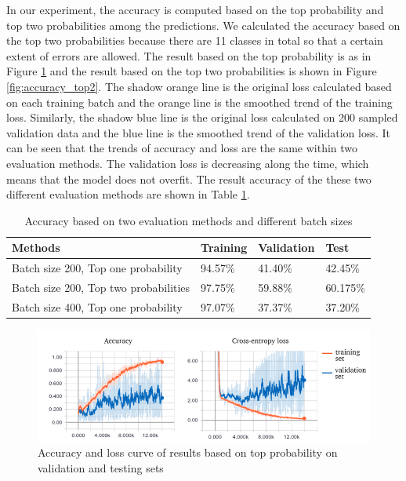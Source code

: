 \documentclass{article}
\begin{document}
\noindent In our experiment, the accuracy is computed based on the top probability and top two probabilities among the predictions. We calculated the accuracy based on the top two probabilities because there are 11 classes in total so that a certain extent of errors are allowed. The result based on the top probability is as in Figure \ref{fig:accuracy_top1} and the result based on the top two probabilities is shown in Figure \ref{fig:accuracy_top2}. The shadow orange line is the original loss calculated based on each training batch and the orange line is the smoothed trend of the training loss. Similarly, the shadow blue line is the original loss calculated on 200 sampled validation data and the blue line is the smoothed trend of the validation loss. It can be seen that the trends of accuracy and loss are the same within two evaluation methods. The validation loss is decreasing along the time, which means that the model does not overfit. The result accuracy of the these two different evaluation methods are shown in Table \ref{tab:accuracy_2_evaluation}.

\begin{table}[h]
  \caption{Accuracy based on two evaluation methods and different batch sizes}
  \label{tab:accuracy_2_evaluation}
  \centering
  \begin{tabular}{llll}
    \toprule
    Methods  &Training	& Validation	& Test\\
    \midrule
    Batch size 200, Top one probability & 94.57\%	& 41.40\%	& 42.45\%\\
    Batch size 200, Top two probabilities & 97.75\%	& 59.88\%	& 60.175\%\\
    Batch size 400, Top one probability & 97.07\%  & 37.37\%  &  37.20\%\\
    \bottomrule
  \end{tabular}
\end{table}

\begin{figure}[h!]
\centering
\includegraphics[width=\textwidth]{accuracy_top1.png}
\caption{Accuracy and loss curve of results based on top probability on validation and testing sets}
\label{fig:accuracy_top1}
\end{figure}
\end{document}
